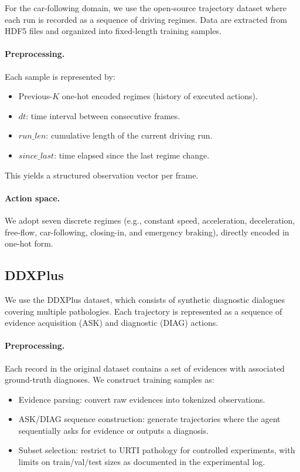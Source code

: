 \documentclass{article} %
\begin{document}
For the car-following domain, we use the open-source trajectory dataset where each run is recorded as a sequence of driving regimes. Data are extracted from HDF5 files and organized into fixed-length training samples.

\paragraph{Preprocessing.}
Each sample is represented by:
\begin{itemize}
  \item Previous-$K$ one-hot encoded regimes (history of executed actions).
  \item $dt$: time interval between consecutive frames.
  \item $run\_len$: cumulative length of the current driving run.
  \item $since\_last$: time elapsed since the last regime change.
\end{itemize}
This yields a structured observation vector per frame.

\paragraph{Action space.}
We adopt seven discrete regimes (e.g., constant speed, acceleration, deceleration, free-flow, car-following, closing-in, and emergency braking), directly encoded in one-hot form.

\subsection{DDXPlus}
\label{Sec:B4}

We use the DDXPlus dataset, which consists of synthetic diagnostic dialogues covering multiple pathologies. Each trajectory is represented as a sequence of evidence acquisition (ASK) and diagnostic (DIAG) actions.

\paragraph{Preprocessing.}
Each record in the original dataset contains a set of evidences with associated ground-truth diagnoses. We construct training samples as:
\begin{itemize}
  \item Evidence parsing: convert raw evidences into tokenized observations.
  \item ASK/DIAG sequence construction: generate trajectories where the agent sequentially asks for evidence or outputs a diagnosis.
  \item Subset selection: restrict to URTI pathology for controlled experiments, with limits on train/val/test sizes as documented in the experimental log.
\end{itemize}
\end{document}

